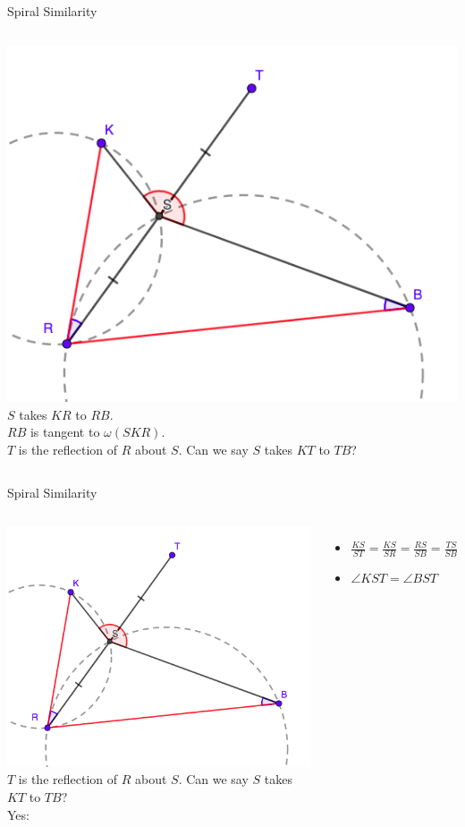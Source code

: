 \documentclass{beamer}
\begin{document}
\begin{frame}{Spiral Similarity}
	\begin{columns}
		\includegraphics[scale=0.34]{spi5.png}
		$S$ takes $KR$ to $RB$.\\
		$RB$ is tangent to $\omega(SKR)$.\\
		\phantom{Spacing}
		$T$ is the reflection of $R$ about $S$. Can we say 
		$S$ takes $KT$ to $TB$?
	\end{columns}
\end{frame}
\begin{frame}{Spiral Similarity}
	\begin{columns}
		\column{0.6\textwidth}
		\includegraphics[scale=0.34]{spi5.png}
		\column{0.4\textwidth}
		$T$ is the reflection of $R$ about $S$. Can we say 
		$S$ takes $KT$ to $TB$?\\
		\phantom{Spacing}
		Yes:
		\begin{itemize}
			\item $\frac{KS}{ST} = \frac{KS}{SR} = \frac{RS}{
				SB} = \frac{TS}{SB}$
			\item $\angle KST = \angle BST$
		\end{itemize}
	\end{columns}
\end{frame}
\end{document}
